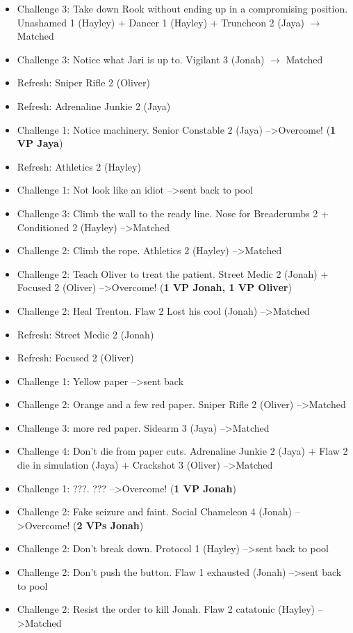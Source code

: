 \begin{itemize}
\item Challenge 3: Take down Rook without ending up in a compromising position.  Unashamed 1 (Hayley) + Dancer 1 (Hayley) + Truncheon 2 (Jaya) $\rightarrow$ Matched
\item Challenge 3: Notice what Jari is up to.  Vigilant 3 (Jonah) $\rightarrow$ Matched
\item Refresh: Sniper Rifle 2 (Oliver)
\item Refresh: Adrenaline Junkie 2 (Jaya)
\item Challenge 1: Notice machinery.  Senior Constable 2 (Jaya)  --\textgreater  Overcome! (\textbf{1 VP Jaya})
\item Refresh: Athletics 2 (Hayley)
\item Challenge 1: Not look like an idiot --\textgreater  sent back to pool
\item Challenge 3: Climb the wall to the ready line. Nose for Breadcrumbs 2 + Conditioned 2 (Hayley) --\textgreater  Matched
\item Challenge 2: Climb the rope. Athletics 2 (Hayley) --\textgreater  Matched
\item Challenge 2: Teach Oliver to treat the patient.  Street Medic 2 (Jonah) + Focused 2 (Oliver) --\textgreater  Overcome! (\textbf{1 VP Jonah, 1 VP Oliver})
\item Challenge 2: Heal Trenton.   {\color[RGB]{255,0,0}Flaw 2 Lost his cool (Jonah)}  --\textgreater  Matched
\item Refresh: Street Medic 2 (Jonah)
\item Refresh: Focused 2 (Oliver)
\item Challenge 1: Yellow paper --\textgreater  sent back
\item Challenge 2: Orange and a few red paper.  Sniper Rifle 2 (Oliver)  --\textgreater  Matched
\item Challenge 3: more red paper.  Sidearm 3 (Jaya) --\textgreater  Matched
\item Challenge 4: Don't die from paper cuts.  Adrenaline Junkie 2 (Jaya) +  {\color[RGB]{255,0,0}Flaw 2 die in simulation (Jaya)}  + Crackshot 3 (Oliver) --\textgreater  Matched
\item Challenge 1: ???.  ???  --\textgreater  Overcome! (\textbf{1 VP Jonah})
\item Challenge 2: Fake seizure and faint.  Social Chameleon 4 (Jonah) --\textgreater  Overcome! (\textbf{2 VPs Jonah})
\item Challenge 2: Don't break down.  Protocol 1 (Hayley) --\textgreater  sent back to pool
\item Challenge 2: Don't push the button.   {\color[RGB]{255,0,0}Flaw 1 exhausted (Jonah)}  --\textgreater  sent back to pool
\item Challenge 2: Resist the order to kill Jonah.   {\color[RGB]{255,0,0}Flaw 2 catatonic (Hayley)}  --\textgreater  Matched 
\end{itemize}



